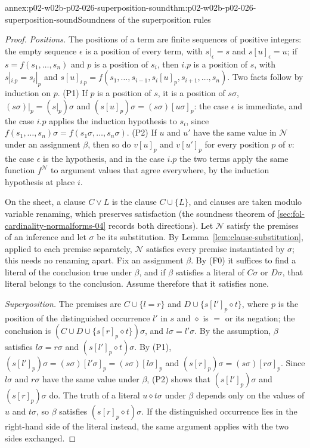 \begin{annexitem}{annex:p02-w02b-p02-026-superposition-sound}{thm:p02-w02b-p02-026-superposition-sound}{Soundness of the superposition rules}
\begin{proof}
\emph{Positions.}  The positions of a term are finite sequences of positive
integers: the empty sequence \(\epsilon\) is a position of every term, with
\(s|_\epsilon=s\) and \(s[u]_\epsilon=u\); if \(s=f(s_1,\ldots,s_n)\) and
\(p\) is a position of \(s_i\), then \(i.p\) is a position of \(s\), with
\(s|_{i.p}=s_i|_p\) and
\(s[u]_{i.p}=f(s_1,\ldots,s_{i-1},s_i[u]_p,s_{i+1},\ldots,s_n)\).
Two facts follow by induction on \(p\).  (P1) If \(p\) is a position of
\(s\), it is a position of \(s\sigma\), \((s\sigma)|_p=(s|_p)\sigma\) and
\((s[u]_p)\sigma=(s\sigma)[u\sigma]_p\): the case \(\epsilon\) is immediate,
and the case \(i.p\) applies the induction hypothesis to \(s_i\), since
\(f(s_1,\ldots,s_n)\sigma=f(s_1\sigma,\ldots,s_n\sigma)\).  (P2) If \(u\) and
\(u'\) have the same value in \(\mathcal N\) under an assignment \(\beta\),
then so do \(v[u]_p\) and \(v[u']_p\) for every position \(p\) of \(v\): the
case \(\epsilon\) is the hypothesis, and in the case \(i.p\) the two terms
apply the same function \(f^{\mathcal N}\) to argument values that agree
everywhere, by the induction hypothesis at place \(i\).

On the sheet, a clause \(C\lor L\) is the clause \(C\cup\{L\}\), and clauses
are taken modulo variable renaming, which preserves satisfaction (the
soundness theorem of \cref{sec:fol-cardinality-normalforms-04} records both
directions).  Let \(\mathcal N\) satisfy the premises of an inference and let
\(\sigma\) be its substitution.  By Lemma~\ref{lem:clause-substitution},
applied to each premise separately, \(\mathcal N\) satisfies every premise
instantiated by \(\sigma\); this needs no renaming apart.  Fix an assignment
\(\beta\).  By (F0) it suffices to find a literal of the conclusion true
under \(\beta\), and if \(\beta\) satisfies a literal of \(C\sigma\) or
\(D\sigma\), that literal belongs to the conclusion.  Assume therefore that it
satisfies none.

\emph{Superposition.}  The premises are \(C\cup\{l=r\}\) and
\(D\cup\{s[l']_p\diamond t\}\), where \(p\) is the position of the
distinguished occurrence \(l'\) in \(s\) and \(\diamond\) is \(=\) or its
negation; the conclusion is \((C\cup D\cup\{s[r]_p\diamond t\})\sigma\), and
\(l\sigma=l'\sigma\).  By the assumption, \(\beta\) satisfies
\(l\sigma=r\sigma\) and \((s[l']_p\diamond t)\sigma\).  By (P1),
\((s[l']_p)\sigma=(s\sigma)[l'\sigma]_p=(s\sigma)[l\sigma]_p\) and
\((s[r]_p)\sigma=(s\sigma)[r\sigma]_p\).  Since \(l\sigma\) and \(r\sigma\)
have the same value under \(\beta\), (P2) shows that \((s[l']_p)\sigma\) and
\((s[r]_p)\sigma\) do.  The truth of a literal \(u\diamond t\sigma\) under
\(\beta\) depends only on the values of \(u\) and \(t\sigma\), so \(\beta\)
satisfies \((s[r]_p\diamond t)\sigma\).  If the distinguished occurrence lies
in the right-hand side of the literal instead, the same argument applies with
the two sides exchanged.


\end{proof}
\end{annexitem}
